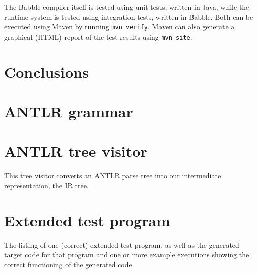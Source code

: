 \documentclass[a4paper]{article}
\begin{document}
The Babble compiler itself is tested using unit tests, written in Java, while the runtime system is tested using integration tests, written in Babble.
Both can be executed using Maven by running \texttt{mvn verify}.
Maven can also generate a graphical (HTML) report of the test results using \texttt{mvn site}.


\section{Conclusions}

\clearpage

\begin{appendices}

\label{grammar}
\section{ANTLR grammar}



\label{visitor}
\section{ANTLR tree visitor}
This tree visitor converts an ANTLR parse tree into our intermediate representation, the IR tree.



\section{Extended test program}
The listing of one (correct) extended test program, as well as the generated
target code for that program and one or more example executions showing the correct functioning of the generated code.

\end{appendices}
\end{document}
